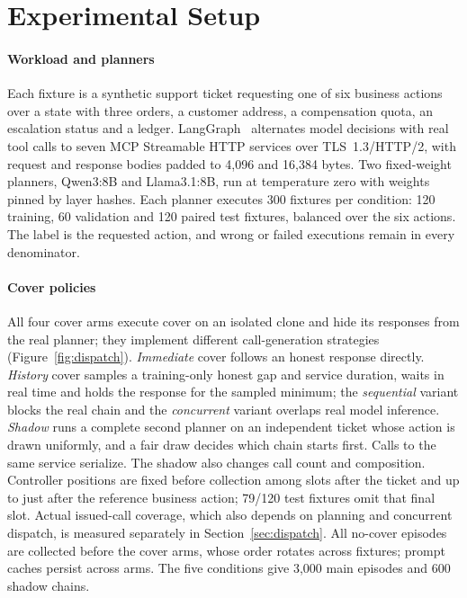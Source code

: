 \section{Experimental Setup}\label{sec:setup}
\paragraph{Workload and planners}
Each fixture is a synthetic support ticket requesting one of six business actions over a state with three orders, a customer address, a compensation quota, an escalation status and a ledger. LangGraph~\cite{langchain2025langgraph} alternates model decisions with real tool calls to seven MCP Streamable HTTP services over TLS~1.3/HTTP/2, with request and response bodies padded to 4,096 and 16,384 bytes. Two fixed-weight planners, Qwen3:8B and Llama3.1:8B, run at temperature zero with weights pinned by layer hashes. Each planner executes 300 fixtures per condition: 120 training, 60 validation and 120 paired test fixtures, balanced over the six actions. The label is the requested action, and wrong or failed executions remain in every denominator.

\paragraph{Cover policies}
All four cover arms execute cover on an isolated clone and hide its responses from the real planner; they implement different call-generation strategies (Figure~\ref{fig:dispatch}). \emph{Immediate} cover follows an honest response directly. \emph{History} cover samples a training-only honest gap and service duration, waits in real time and holds the response for the sampled minimum; the \emph{sequential} variant blocks the real chain and the \emph{concurrent} variant overlaps real model inference. \emph{Shadow} runs a complete second planner on an independent ticket whose action is drawn uniformly, and a fair draw decides which chain starts first. Calls to the same service serialize. The shadow also changes call count and composition. Controller positions are fixed before collection among slots after the ticket and up to just after the reference business action; 79/120 test fixtures omit that final slot. Actual issued-call coverage, which also depends on planning and concurrent dispatch, is measured separately in Section~\ref{sec:dispatch}. All no-cover episodes are collected before the cover arms, whose order rotates across fixtures; prompt caches persist across arms. The five conditions give 3,000 main episodes and 600 shadow chains.

